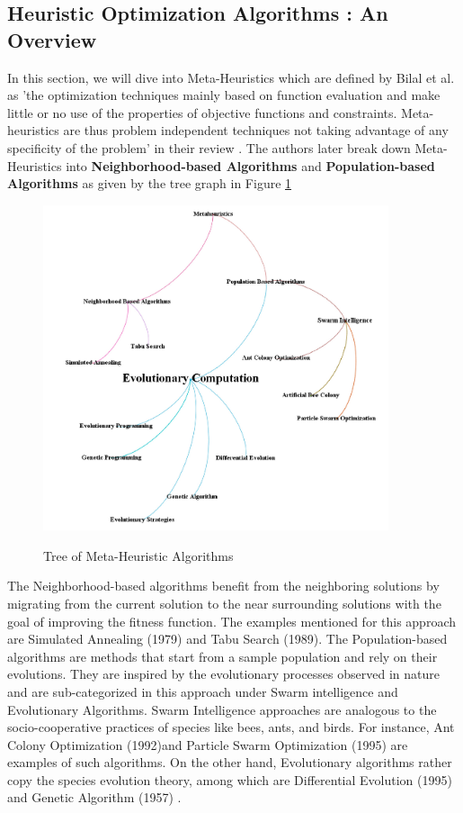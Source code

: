 \subsection{Heuristic Optimization Algorithms : An Overview}
In this section, we will dive into Meta-Heuristics which are defined by Bilal et al. as 'the optimization
techniques mainly based on function evaluation and make little
or no use of the properties of objective functions and constraints.
Meta-heuristics are thus problem independent techniques not taking
advantage of any specificity of the problem’ in their review \cite{R37}.
The authors later break down Meta-Heuristics into \textbf{Neighborhood-based Algorithms} and \textbf{Population-based Algorithms}
as given by the tree graph in Figure \ref{Tree}

\begin{figure}[H]
    \begin{center}
        \includegraphics[width=4in]{images/Chap1/Tree_Metaheuristic.png}\\
        \caption{Tree of Meta-Heuristic Algorithms \cite{R37}}
        \label{Tree}
    \end{center}
\end{figure}

The Neighborhood-based algorithms benefit from the neighboring solutions by migrating from the current solution to 
the near surrounding solutions with the goal of improving the fitness function. The examples mentioned for this 
approach are Simulated Annealing (1979) and Tabu Search (1989). The Population-based algorithms are methods that start from a sample population and rely on their evolutions. 
They are inspired by the evolutionary processes observed in nature and are sub-categorized in this approach under 
Swarm intelligence and Evolutionary Algorithms. 
Swarm Intelligence approaches are analogous to the socio-cooperative practices of species like bees, ants, and birds. 
For instance, Ant Colony Optimization (1992)and Particle Swarm Optimization (1995) are examples of such algorithms. 
On the other hand, Evolutionary algorithms rather copy the species evolution theory, among which are Differential 
Evolution (1995) and Genetic Algorithm (1957) \cite{R37}.


